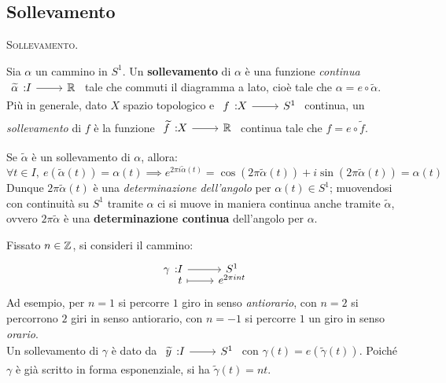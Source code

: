 \subsection{Sollevamento}

\begin{define} \textsc{Sollevamento.}\\
	\begin{minipage}[t]{0.78\textwidth}
		Sia $\alpha$ un cammino in $S^1$. Un \textbf{sollevamento} di $\alpha$ è una funzione \textit{continua} $\funz {\widetilde{\alpha}} I \realset$ tale che commuti il diagramma a lato, cioè tale che $\alpha= e\circ \widetilde{\alpha}$. \\
		Più in generale, dato $X$ spazio topologico e $\funz f X {S^1}$ continua, un \textit{sollevamento} di $f$ è la funzione $\funz {\widetilde{f}} X \realset$ continua tale che $f=e\circ \widetilde{f}$.
	\end{minipage}
	\begin{minipage}[t]{0.21\textwidth}\vspace{-10pt}
	\end{minipage}
\end{define}
Se $\widetilde{\alpha}$ è un sollevamento di $\alpha$, allora:
	\begin{equation*}
		\forall t\in I, \ e(\widetilde{\alpha}(t))=\alpha(t)\implies e^{2\pi i \widetilde{\alpha}(t)}=\cos(2\pi \widetilde{\alpha}(t))+i\sin(2\pi\widetilde{\alpha}(t))=\alpha(t)
	\end{equation*}
Dunque $2\pi\widetilde{\alpha}(t)$ è una \textit{determinazione dell'angolo} per $\alpha(t)\in S^1$; muovendosi con continuità su $S^1$ tramite $\alpha$ ci si muove in maniera continua anche tramite $\widetilde{\alpha}$, ovvero $2\pi\widetilde{\alpha}$ è una \textbf{determinazione continua} dell'angolo per $\alpha$.
\begin{example}
	Fissato $n\in\mathbb{Z}$, si consideri il cammino:
	\begin{equation*}
		\funztot \gamma I {S^1} t {e^{2\pi i nt}}
	\end{equation*}
	Ad esempio, per $n=1$ si percorre $1$ giro in senso \textit{antiorario}, con $n=2$ si percorrono $2$ giri in senso antiorario, con $n=-1$ si percorre $1$ un giro in senso \textit{orario}.\\ 
	Un sollevamento di $\gamma$ è dato da $\funz {\widetilde{y}} I {S^1}$ con $\gamma(t)=e(\widetilde{\gamma}(t))$. Poiché $\gamma$ è già scritto in forma esponenziale, si ha $\widetilde{\gamma}(t)=nt$.
\end{example}
